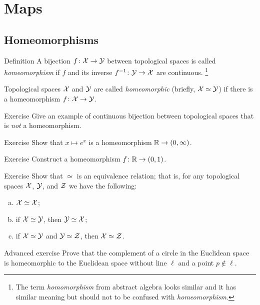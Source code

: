 \chapter{Maps}



\section{Homeomorphisms}

\begin{thm}{Definition}\label{def:cont-top}
A bijection $f\colon\mathcal{X}\to\mathcal{Y}$ between topological spaces 
is called \emph{homeomorphism} if $f$ and its inverse $f^{-1}\colon\mathcal{Y}\to\mathcal{X}$
are continuous.%
\footnote{The term \emph{homomorphism} from abstract algebra looks similar and it has similar meaning but should not to be confused with \emph{homeomorphism}.}

Topological spaces $\mathcal{X}$ and $\mathcal{Y}$ are called \emph{homeomorphic} (briefly, $\mathcal{X}\simeq\mathcal{Y}$) if there is a homeomorphism $f\colon\mathcal{X}\to\mathcal{Y}$.
\end{thm}


\begin{thm}{Exercise}
Give an example of continuous bijection between topological spaces that is \emph{not} a homeomorphism.
\end{thm}

\begin{thm}{Exercise}
Show that $x\mapsto e^x$ is a homeomorphism $\mathbb{R}\to (0,\infty)$.
\end{thm}

\begin{thm}{Exercise}
Construct a homeomorphism $f\colon\mathbb{R}\to (0,1)$.
\end{thm}

\begin{thm}{Exercise}
Show that $\simeq$ is an equivalence relation;
that is, for any topological spaces $\mathcal{X}$, $\mathcal{Y}$, and $\mathcal{Z}$ we have the following:
\begin{enumerate}[(a)]
 \item $\mathcal{X}\simeq\mathcal{X}$;
 \item if $\mathcal{X}\simeq\mathcal{Y}$, then $\mathcal{Y}\simeq\mathcal{X}$;
 \item if $\mathcal{X}\simeq\mathcal{Y}$ and $\mathcal{Y}\simeq\mathcal{Z}$, then $\mathcal{X}\simeq\mathcal{Z}$.
\end{enumerate}

\end{thm}

\begin{thm}{Advanced exercise}
Prove that the complement of a circle in the Euclidean space is homeomorphic to the Euclidean space without line $\ell$ and a point $p\not\in\ell$.
\end{thm}

